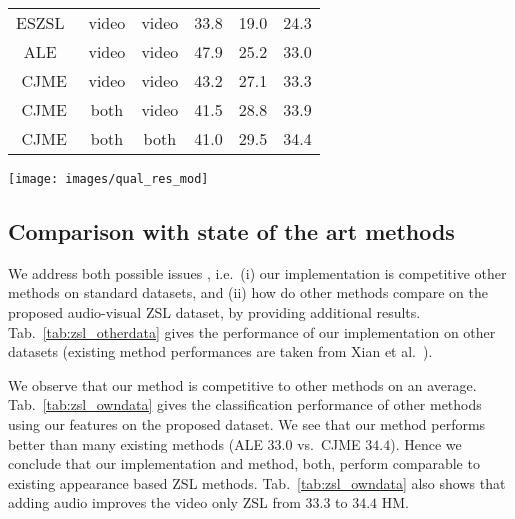 \begin{table*}
\begin{minipage}[b]{.32\textwidth}
{\begin{tabular}{c|cc|ccc}
ESZSL~\cite{romera2015embarrassingly} & video & video & 33.8 & 19.0 & 24.3 \\
ALE~\cite{akata2016label} & video & video & 47.9 & 25.2 & 33.0 \\
\hline
CJME & video & video & 43.2 & 27.1 & 33.3\\
CJME & both & video & 41.5 & 28.8 & 33.9 \\
CJME & both & both & 41.0 & 29.5 & {34.4} \\
\hline
\end{tabular}
}
\caption{Comparison with existing methods on proposed dataset (projection based methods only, see sec.~\ref{sec:sota} for details)}
\label{tab:zsl_owndata}
\end{minipage}
\end{table*}

 
\begin{figure*}
\centering

\texttt{[image: images/qual\_res\_mod]}
\caption{Qualitative crossmodal retrieval results with the proposed method. Each block of two rows from top to bottom corresponds to text to audio, text to video, audio to video and video to video respectively. The small icons on the left top of each image indicates the modality considered for that specific video. Please see detailed results video in the supplementary material.}
\label{fig:qualres}
\vspace{-0.4em}
\end{figure*}
 
 \subsection{Comparison with state of the art methods}
 \label{sec:sota}
 We address both possible issues , i.e.\ (i) our implementation is competitive \wrt other methods on standard datasets, and (ii) how do other methods compare on the proposed audio-visual ZSL dataset, by providing additional results. Tab.~\ref{tab:zsl_otherdata} gives the performance of our implementation on other datasets (existing method performances are taken from Xian et al.~\cite{xian2018zero}). 
 
 We observe that our method is competitive to other methods on an average. Tab.~\ref{tab:zsl_owndata} gives the classification performance of other methods using our features on the proposed dataset. We see that our method performs better than many existing methods (\eg ALE $33.0$ vs.\ CJME $34.4$). Hence we conclude that our implementation and method, both, perform comparable to existing appearance based ZSL methods. Tab.~\ref{tab:zsl_owndata} also shows that adding audio improves the video only ZSL from $33.3$ to $34.4$ HM. 
 
